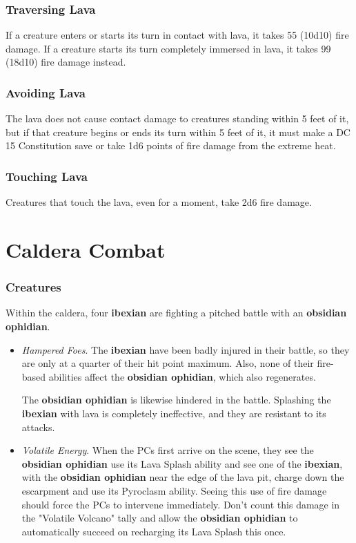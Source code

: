 \documentclass[10pt,a4paper,twoside,bg=print,twocolumn,openany,nodeprecatedcode]{dndbook}
\begin{document}
\subsubsection{Traversing Lava}
If a creature enters or starts its turn in contact with lava, it takes 55 (10d10) fire damage. If a creature starts its turn completely immersed in lava, it takes 99 (18d10) fire damage instead.

\subsubsection{Avoiding Lava}
The lava does not cause contact damage to creatures standing within 5 feet of it, but if that creature begins or ends its turn within 5 feet of it, it must make a DC 15 Constitution save or take 1d6 points of fire damage from the extreme heat.

\subsubsection{Touching Lava}
Creatures that touch the lava, even for a moment, take 2d6 fire damage.

\section{Caldera Combat}
\subsubsection{Creatures}
Within the caldera, four \textbf{ibexian} are fighting a pitched battle with an \textbf{obsidian ophidian}.


\begin{itemize}
\item{\textit{Hampered Foes}.}
The \textbf{ibexian} have been badly injured in their battle, so they are only at a quarter of their hit point maximum. Also, none of their fire-based abilities affect the \textbf{obsidian ophidian}, which also regenerates.

The \textbf{obsidian ophidian} is likewise hindered in the battle. Splashing the \textbf{ibexian} with lava is completely ineffective, and they are resistant to its attacks.

\item{\textit{Volatile Energy}.}
When the PCs first arrive on the scene, they see the \textbf{obsidian ophidian} use its Lava Splash ability and see one of the \textbf{ibexian}, with the \textbf{obsidian ophidian} near the edge of the lava pit, charge down the escarpment and use its Pyroclasm ability. Seeing this use of fire damage should force the PCs to intervene immediately. Don't count this damage in the "Volatile Volcano" tally and allow the \textbf{obsidian ophidian} to automatically succeed on recharging its Lava Splash this once.
\end{itemize}
\end{document}
